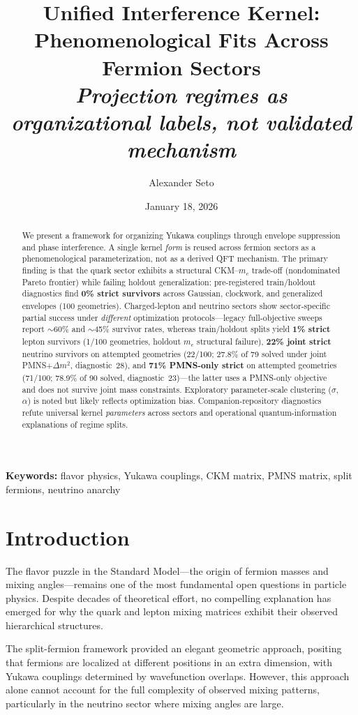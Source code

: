 \documentclass[12pt,a4paper]{article}
\title{Unified Interference Kernel: Phenomenological Fits Across Fermion Sectors\\[0.4em]
\large\textit{Projection regimes as organizational labels, not validated mechanism}}
\author{Alexander Seto}
\date{January 18, 2026}
\begin{document}
\maketitle

\begin{abstract}
We present a framework for organizing Yukawa couplings through envelope suppression and phase interference. A single kernel \emph{form} is reused across fermion sectors as a phenomenological parameterization, not as a derived QFT mechanism. The primary finding is that the quark sector exhibits a structural CKM--$m_c$ trade-off (nondominated Pareto frontier) while failing holdout generalization: pre-registered train/holdout diagnostics find \textbf{0\% strict survivors} across Gaussian, clockwork, and generalized envelopes (100 geometries). Charged-lepton and neutrino sectors show sector-specific partial success under \emph{different} optimization protocols---legacy full-objective sweeps report $\sim$60\% and $\sim$45\% survivor rates, whereas train/holdout splits yield \textbf{1\% strict} lepton survivors (1/100 geometries, holdout $m_e$ structural failure), \textbf{22\% joint strict} neutrino survivors on attempted geometries (22/100; 27.8\% of 79 solved under joint PMNS+$\Delta m^2$, diagnostic~28), and \textbf{71\% PMNS-only strict} on attempted geometries (71/100; 78.9\% of 90 solved, diagnostic~23)---the latter uses a PMNS-only objective and does not survive joint mass constraints. Exploratory parameter-scale clustering ($\sigma$, $\alpha$) is noted but likely reflects optimization bias. Companion-repository diagnostics refute universal kernel \emph{parameters} across sectors and operational quantum-information explanations of regime splits.
\end{abstract}

\noindent\textbf{Keywords:} flavor physics, Yukawa couplings, CKM matrix, PMNS matrix, split fermions, neutrino anarchy

\section{Introduction}

The flavor puzzle in the Standard Model---the origin of fermion masses and mixing angles---remains one of the most fundamental open questions in particle physics. Despite decades of theoretical effort, no compelling explanation has emerged for why the quark and lepton mixing matrices exhibit their observed hierarchical structures.

The split-fermion framework \citep{ArkaniHamed2000} provided an elegant geometric approach, positing that fermions are localized at different positions in an extra dimension, with Yukawa couplings determined by wavefunction overlaps. However, this approach alone cannot account for the full complexity of observed mixing patterns, particularly in the neutrino sector where mixing angles are large.
\end{document}
